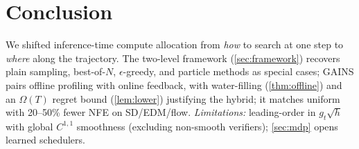 \section{Conclusion}
\label{sec:conclusion}

We shifted inference-time compute allocation from \emph{how} to search at one step to \emph{where} along the trajectory. The two-level framework (\cref{sec:framework}) recovers plain sampling, best-of-$N$, $\epsilon$-greedy, and particle methods as special cases; \textsc{GAINS} pairs offline profiling with online feedback, with water-filling (\cref{thm:offline}) and an $\Omega(T)$ regret bound (\cref{lem:lower}) justifying the hybrid; it matches uniform with 20--50\% fewer NFE on SD/EDM/flow. \emph{Limitations:} leading-order in $g_t\sqrt h$ with global $C^{1,1}$ smoothness (excluding non-smooth verifiers); \cref{sec:mdp} opens learned schedulers.
